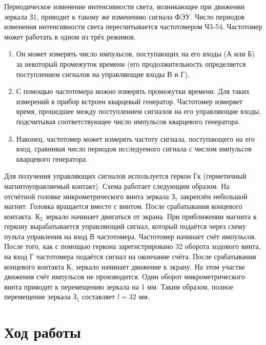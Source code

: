 \documentclass[a4paper,12pt]{article}
\begin{document}
	 Периодическое изменение интенсивности света, возникающее при движении зеркала З1, приводит к такому же изменению сигнала ФЭУ. Число периодов изменения интенсивности света пересчитывается частотомером Ч3-54. Частотомер может работать в одном из трёх режимов.
	 \begin{enumerate}
	 	\item Он может измерять число импульсов, поступающих на его входы (А или Б) за некоторый промежуток времени (его продолжительность определяется поступлением сигналов на управляющие входы В и Г).
	 	\item С помощью частотомера можно измерять промежутки времени. Для таких измерений в прибор встроен кварцевый генератор. Частотомер измеряет время, прошедшее между поступлением сигналов на его управляющие входы, подсчитывая соответствующее число импульсов кварцевого генератора.
	 	\item Наконец, частотомер может измерять частоту сигнала, поступающего на его вход, сравнивая число периодов исследуемого сигнала с числом импульсов кварцевого генератора. 
	 	
 	\end{enumerate}
	 	
	 	Для получения управляющих сигналов используется геркон Гк (герметичный магнитоуправляемый контакт). Схема работает следующим образом. На отсчётной головке микрометрического винта зеркала З$_1$ закреплён небольшой магнит. Головка вращается вместе с винтом. После срабатывания концевого контакта. К$_2$ зеркало начинает двигаться от экрана. При приближении магнита к геркону вырабатывается управляющий сигнал, который подаётся через схему пульта управления на вход В частотомера. Частотомер начинает счёт импульсов. После того, как с помощью геркона зарегистрировано 32 оборота ходового винта, на вход Г частотомера подаётся сигнал на окончание счёта. После срабатывания концевого контакта К, зеркало начинает движение к экрану. На этом участке движения счёт импульсов не производится. Один оборот микрометрического винта приводит к перемещению зеркала на 1 мм. Таким образом, полное перемещение зеркала З$_1$ составляет $l = 32$ мм.
	 	
	 	
	 	\section*{Ход работы}
\end{document}
